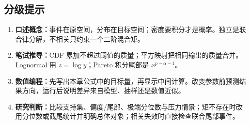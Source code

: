 \subsection*{分级提示}
\begingroup\small
\begin{enumerate}[nosep,leftmargin=*]
  \item \textbf{口述概念：}事件在原空间，分布在目标空间；密度要积分才是概率。独立是联合律分解，不相关只约束一个二阶混合矩。
  \item \textbf{笔试推导：}CDF 累加不超过阈值的质量；平方映射把相同输出的质量合并。Lognormal 用 $z=\log y$；Pareto 积分尾部是 $x^{p-\alpha-1}$。
  \item \textbf{数值编程：}先写出本章公式中的目标量，再显示中间计算。改变参数前预测结果方向，运行后说明差异来自模型、抽样还是数值近似。
  \item \textbf{研究判断：}比较支持集、偏度/尾部、极端分位数与压力情景；矩不存在时改用分位数或截尾统计并明确总体对象；相关失效时直接检查联合尾部事件。
\end{enumerate}
\endgroup


\MFQMappedUpperChSevenHints
